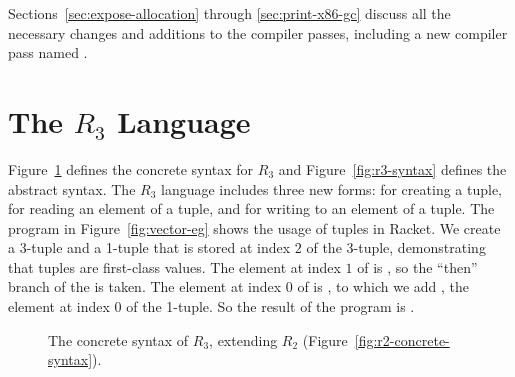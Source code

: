 \documentclass[11pt]{book}
\newcommand{\gray}[1]{{\color{gray} #1}}
\begin{document}
Sections~\ref{sec:expose-allocation} through \ref{sec:print-x86-gc}
discuss all the necessary changes and additions to the compiler
passes, including a new compiler pass named .

\section{The $R_3$ Language}
\label{sec:r3}

Figure~\ref{fig:r3-concrete-syntax} defines the concrete syntax for
$R_3$ and Figure~\ref{fig:r3-syntax} defines the abstract syntax.  The
$R_3$ language includes three new forms:  for creating a
tuple,  for reading an element of a tuple, and
 for writing to an element of a tuple. The program
in Figure~\ref{fig:vector-eg} shows the usage of tuples in Racket. We
create a 3-tuple  and a 1-tuple that is stored at index $2$ of
the 3-tuple, demonstrating that tuples are first-class values.  The
element at index $1$ of  is , so the ``then'' branch
of the  is taken.  The element at index $0$ of  is
, to which we add , the element at index $0$ of the
1-tuple. So the result of the program is .

\begin{figure}[tbp]
\centering
\fbox{
\begin{minipage}{0.96\textwidth}
\[
\begin{array}{lcl}
  \Type &::=& \gray{\key{Integer} \mid \key{Boolean}}
  \mid (\key{Vector}\;\Type\ldots) \mid \key{Void}\\
  \Exp &::=& \gray{  \Int \mid \CREAD{} \mid \CNEG{\Exp} \mid \CADD{\Exp}{\Exp} \mid \CSUB{\Exp}{\Exp} }  \\
  &\mid&  \gray{  \Var \mid \CLET{\Var}{\Exp}{\Exp}  }\\
  &\mid& \gray{ \key{\#t} \mid \key{\#f} 
   \mid (\key{and}\;\Exp\;\Exp) 
   \mid (\key{or}\;\Exp\;\Exp)
   \mid (\key{not}\;\Exp) } \\
  &\mid& \gray{  (\itm{cmp}\;\Exp\;\Exp) 
   \mid \CIF{\Exp}{\Exp}{\Exp}  } \\
  &\mid& (\key{vector}\;\Exp\ldots) 
   \mid (\key{vector-ref}\;\Exp\;\Int) \\
  &\mid& (\key{vector-set!}\;\Exp\;\Int\;\Exp) 
   \mid (\key{vector-length}\;\Exp) \\
  &\mid& (\key{void}) \mid (\key{has-type}~\Exp~\Type)\\
  R_3 &::=& \Exp
\end{array}
\]
\end{minipage}
}
\caption{The concrete syntax of $R_3$, extending $R_2$
  (Figure~\ref{fig:r2-concrete-syntax}).}
\label{fig:r3-concrete-syntax}
\end{figure}
\end{document}

